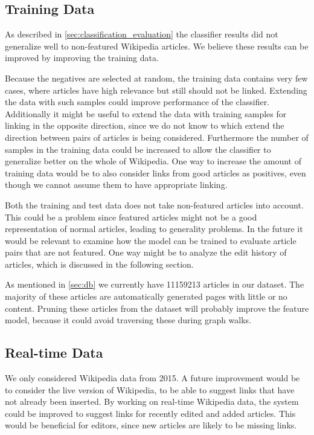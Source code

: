 \subsection{Training Data}
As described in \cref{sec:classification_evaluation} the classifier results did not generalize well to non-featured Wikipedia articles. We believe these results can be improved by improving the training data.

Because the negatives are selected at random, the training data contains very few cases, where articles have high relevance but still should not be linked. Extending the data with such samples could improve performance of the classifier. Additionally it might be useful to extend the data with training samples for linking in the opposite direction, since we do not know to which extend the direction between pairs of articles is being considered. Furthermore the number of samples in the training data could be increased to allow the classifier to generalize better on the whole of Wikipedia. One way to increase the amount of training data would be to also consider links from good articles as positives, even though we cannot assume them to have appropriate linking.

Both the training and test data does not take non-featured articles into account. This could be a problem since featured articles might not be a good representation of normal articles, leading to generality problems. In the future it would be relevant to examine how the model can be trained to evaluate article pairs that are not featured. One way might be to analyze the edit history of articles, which is discussed in the following section. %

As mentioned in \cref{sec:db} we currently have \num{11159213} articles in our dataset. The majority of these articles are automatically generated pages with little or no content. Pruning these articles from the dataset will probably improve the feature model, because it could avoid traversing these during graph walks.

\subsection{Real-time Data}
We only considered Wikipedia data from 2015. A future improvement would be to consider the live version of Wikipedia, to be able to suggest links that have not already been inserted.
By working on real-time Wikipedia data, the system could be improved to suggest links for recently edited and added articles. This would be beneficial for editors, since new articles are likely to be missing links.

